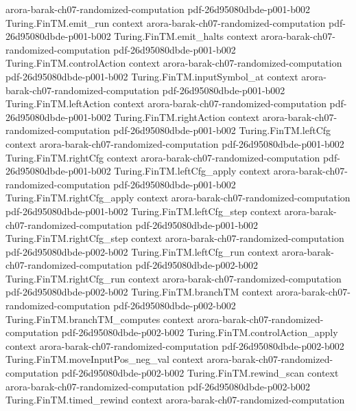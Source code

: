 \begin{theorem}
  {arora-barak-ch07-randomized-computation}
  {pdf-26d95080dbde-p001-b002}
\proofstep
  {Turing.FinTM.emit_run}
  {context}
  {arora-barak-ch07-randomized-computation}
  {pdf-26d95080dbde-p001-b002}
\proofstep
  {Turing.FinTM.emit_halts}
  {context}
  {arora-barak-ch07-randomized-computation}
  {pdf-26d95080dbde-p001-b002}
\proofstep
  {Turing.FinTM.controlAction}
  {context}
  {arora-barak-ch07-randomized-computation}
  {pdf-26d95080dbde-p001-b002}
\proofstep
  {Turing.FinTM.inputSymbol_at}
  {context}
  {arora-barak-ch07-randomized-computation}
  {pdf-26d95080dbde-p001-b002}
\proofstep
  {Turing.FinTM.leftAction}
  {context}
  {arora-barak-ch07-randomized-computation}
  {pdf-26d95080dbde-p001-b002}
\proofstep
  {Turing.FinTM.rightAction}
  {context}
  {arora-barak-ch07-randomized-computation}
  {pdf-26d95080dbde-p001-b002}
\proofstep
  {Turing.FinTM.leftCfg}
  {context}
  {arora-barak-ch07-randomized-computation}
  {pdf-26d95080dbde-p001-b002}
\proofstep
  {Turing.FinTM.rightCfg}
  {context}
  {arora-barak-ch07-randomized-computation}
  {pdf-26d95080dbde-p001-b002}
\proofstep
  {Turing.FinTM.leftCfg_apply}
  {context}
  {arora-barak-ch07-randomized-computation}
  {pdf-26d95080dbde-p001-b002}
\proofstep
  {Turing.FinTM.rightCfg_apply}
  {context}
  {arora-barak-ch07-randomized-computation}
  {pdf-26d95080dbde-p001-b002}
\proofstep
  {Turing.FinTM.leftCfg_step}
  {context}
  {arora-barak-ch07-randomized-computation}
  {pdf-26d95080dbde-p001-b002}
\proofstep
  {Turing.FinTM.rightCfg_step}
  {context}
  {arora-barak-ch07-randomized-computation}
  {pdf-26d95080dbde-p002-b002}
\proofstep
  {Turing.FinTM.leftCfg_run}
  {context}
  {arora-barak-ch07-randomized-computation}
  {pdf-26d95080dbde-p002-b002}
\proofstep
  {Turing.FinTM.rightCfg_run}
  {context}
  {arora-barak-ch07-randomized-computation}
  {pdf-26d95080dbde-p002-b002}
\proofstep
  {Turing.FinTM.branchTM}
  {context}
  {arora-barak-ch07-randomized-computation}
  {pdf-26d95080dbde-p002-b002}
\proofstep
  {Turing.FinTM.branchTM_computes}
  {context}
  {arora-barak-ch07-randomized-computation}
  {pdf-26d95080dbde-p002-b002}
\proofstep
  {Turing.FinTM.controlAction_apply}
  {context}
  {arora-barak-ch07-randomized-computation}
  {pdf-26d95080dbde-p002-b002}
\proofstep
  {Turing.FinTM.moveInputPos_neg_val}
  {context}
  {arora-barak-ch07-randomized-computation}
  {pdf-26d95080dbde-p002-b002}
\proofstep
  {Turing.FinTM.rewind_scan}
  {context}
  {arora-barak-ch07-randomized-computation}
  {pdf-26d95080dbde-p002-b002}
\proofstep
  {Turing.FinTM.timed_rewind}
  {context}
  {arora-barak-ch07-randomized-computation}

\end{theorem}
